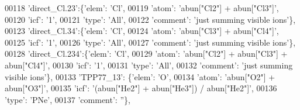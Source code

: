 \begin{DoxyCode}
00118                          \textcolor{stringliteral}{'direct\_Cl.23'}:\{\textcolor{stringliteral}{'elem'}: \textcolor{stringliteral}{'Cl'},
00119                                        \textcolor{stringliteral}{'atom'}: \textcolor{stringliteral}{'abun["Cl2"] + abun["Cl3"]'},
00120                                        \textcolor{stringliteral}{'icf'}: \textcolor{stringliteral}{'1'},
00121                                        \textcolor{stringliteral}{'type'}: \textcolor{stringliteral}{'All'},
00122                                        \textcolor{stringliteral}{'comment'}: \textcolor{stringliteral}{'just summing visible ions'}\},
00123                          \textcolor{stringliteral}{'direct\_Cl.34'}:\{\textcolor{stringliteral}{'elem'}: \textcolor{stringliteral}{'Cl'},
00124                                        \textcolor{stringliteral}{'atom'}: \textcolor{stringliteral}{'abun["Cl3"] + abun["Cl4"]'},
00125                                        \textcolor{stringliteral}{'icf'}: \textcolor{stringliteral}{'1'},
00126                                        \textcolor{stringliteral}{'type'}: \textcolor{stringliteral}{'All'},
00127                                        \textcolor{stringliteral}{'comment'}: \textcolor{stringliteral}{'just summing visible ions'}\},
00128                          \textcolor{stringliteral}{'direct\_Cl.234'}:\{\textcolor{stringliteral}{'elem'}: \textcolor{stringliteral}{'Cl'},
00129                                        \textcolor{stringliteral}{'atom'}: \textcolor{stringliteral}{'abun["Cl2"] + abun["Cl3"] + abun["Cl4"]'},
00130                                        \textcolor{stringliteral}{'icf'}: \textcolor{stringliteral}{'1'},
00131                                        \textcolor{stringliteral}{'type'}: \textcolor{stringliteral}{'All'},
00132                                        \textcolor{stringliteral}{'comment'}: \textcolor{stringliteral}{'just summing visible ions'}\},
00133                          \textcolor{stringliteral}{'TPP77\_13'}: \{\textcolor{stringliteral}{'elem'}: \textcolor{stringliteral}{'O'},
00134                                       \textcolor{stringliteral}{'atom'}: \textcolor{stringliteral}{'abun["O2"] + abun["O3"]'},
00135                                       \textcolor{stringliteral}{'icf'}: \textcolor{stringliteral}{'(abun["He2"] + abun["He3"]) / abun["He2"]'},
00136                                       \textcolor{stringliteral}{'type'}: \textcolor{stringliteral}{'PNe'},
00137                                       \textcolor{stringliteral}{'comment'}: \textcolor{stringliteral}{''}\},

\end{DoxyCode}
